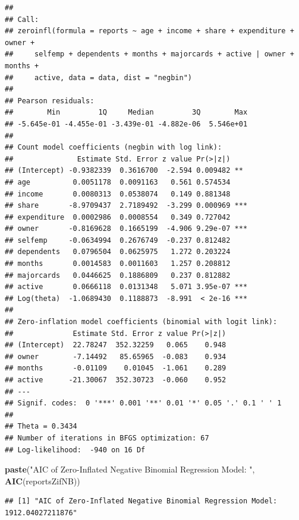 \documentclass[
]{article}
\newenvironment{Shaded}{\begin{snugshade}}{\end{snugshade}}
\newcommand{\KeywordTok}[1]{\textcolor[rgb]{0.13,0.29,0.53}{\textbf{#1}}}
\newcommand{\NormalTok}[1]{#1}
\newcommand{\StringTok}[1]{\textcolor[rgb]{0.31,0.60,0.02}{#1}}
\begin{document}
\begin{verbatim}
## 
## Call:
## zeroinfl(formula = reports ~ age + income + share + expenditure + owner + 
##     selfemp + dependents + months + majorcards + active | owner + months + 
##     active, data = data, dist = "negbin")
## 
## Pearson residuals:
##        Min         1Q     Median         3Q        Max 
## -5.645e-01 -4.455e-01 -3.439e-01 -4.882e-06  5.546e+01 
## 
## Count model coefficients (negbin with log link):
##               Estimate Std. Error z value Pr(>|z|)    
## (Intercept) -0.9382339  0.3616700  -2.594 0.009482 ** 
## age          0.0051178  0.0091163   0.561 0.574534    
## income       0.0080313  0.0538074   0.149 0.881348    
## share       -8.9709437  2.7189492  -3.299 0.000969 ***
## expenditure  0.0002986  0.0008554   0.349 0.727042    
## owner       -0.8169628  0.1665199  -4.906 9.29e-07 ***
## selfemp     -0.0634994  0.2676749  -0.237 0.812482    
## dependents   0.0796504  0.0625975   1.272 0.203224    
## months       0.0014583  0.0011603   1.257 0.208812    
## majorcards   0.0446625  0.1886809   0.237 0.812882    
## active       0.0666118  0.0131348   5.071 3.95e-07 ***
## Log(theta)  -1.0689430  0.1188873  -8.991  < 2e-16 ***
## 
## Zero-inflation model coefficients (binomial with logit link):
##              Estimate Std. Error z value Pr(>|z|)
## (Intercept)  22.78247  352.32259   0.065    0.948
## owner        -7.14492   85.65965  -0.083    0.934
## months       -0.01109    0.01045  -1.061    0.289
## active      -21.30067  352.30723  -0.060    0.952
## ---
## Signif. codes:  0 '***' 0.001 '**' 0.01 '*' 0.05 '.' 0.1 ' ' 1 
## 
## Theta = 0.3434 
## Number of iterations in BFGS optimization: 67 
## Log-likelihood:  -940 on 16 Df
\end{verbatim}

\begin{Shaded}
\begin{Highlighting}[]
\KeywordTok{paste}\NormalTok{(}\StringTok{"AIC of Zero-Inflated Negative Binomial Regression Model: "}\NormalTok{, }\KeywordTok{AIC}\NormalTok{(reportsZifNB))}
\end{Highlighting}
\end{Shaded}

\begin{verbatim}
## [1] "AIC of Zero-Inflated Negative Binomial Regression Model:  1912.04027211876"
\end{verbatim}
\end{document}
